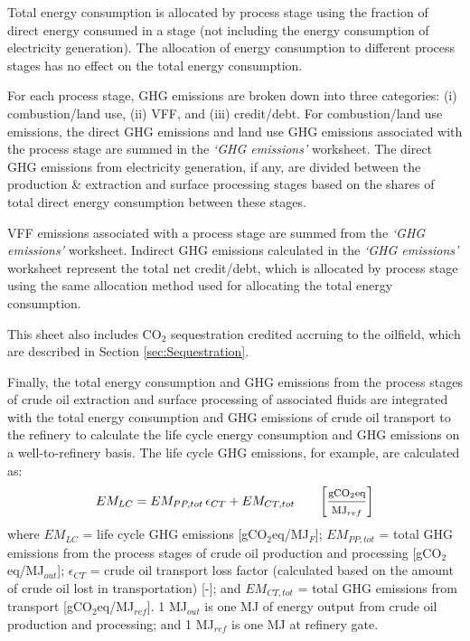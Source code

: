 \documentclass[11pt]{report}
\newcommand{\marg}[1]{{\footnotesize\textit{\textcolor{stanford}{'#1'}}}}
\newcommand{\marginnote}[1]{\marginpar{\marg{#1}}}
\newcommand{\sheet}[1]{\textit{`{#1}'}}
\begin{document}
Total energy consumption is allocated by process stage using the fraction of direct energy consumed in a stage (not including the energy consumption of electricity generation). The allocation of energy consumption to different process stages has no effect on the total energy consumption.

For each process stage, GHG emissions are broken down into three categories: (i) combustion/land use, (ii) VFF, and (iii) credit/debt. For combustion/land use emissions, the direct GHG emissions and land use GHG emissions associated with the process stage are summed \marginnote{GHG \\ Emissions Table 1} in the \sheet{GHG emissions} worksheet. The direct GHG emissions from electricity generation, if any, are divided between the production \& extraction and surface processing stages based on the shares of total direct energy consumption between these stages. 

VFF emissions associated with a process stage are summed from the \sheet{GHG emissions} \marginnote{GHG \\ Emissions Table 1} worksheet. Indirect GHG emissions calculated in the \sheet{GHG emissions} worksheet represent the total net credit/debt, which is \marginnote{GHG \\ Emissions Table 2} allocated by process stage using the same allocation method used for allocating the total energy consumption.

This sheet also includes CO$_2$ sequestration credited accruing to the oilfield, which are described in Section \ref{sec:Sequestration}.

Finally, the total energy consumption and GHG emissions from the process stages of crude oil extraction and surface processing of associated fluids are integrated with the total energy consumption and GHG emissions of crude oil transport to the refinery to calculate the life cycle energy consumption and GHG emissions on a well-to-refinery basis. The life cycle GHG emissions, for example, are calculated as:
\begin{equation}
EM_{LC} = EM_{PP,tot}\,\epsilon_{CT}+EM_{CT,tot} \quad\quad\footnotesize{\left[\frac{\text{gCO$_{2}$eq}}{\text{MJ$_{ref}$}}\right]}
\end{equation}
where $EM_{LC}$ = life cycle GHG emissions [gCO$_{2}$eq/MJ$_{F}$]; $EM_{PP,tot}$ = total GHG emissions from the process stages of crude oil production and processing [gCO$_{2}$eq/MJ$_{out}$]; $\epsilon_{CT}$ = crude oil transport loss factor (calculated based on the amount of crude oil lost in transportation) [-]; and $EM_{CT,tot}$ = total GHG emissions from transport [gCO$_{2}$eq/MJ$_{ref}$]. 1 MJ$_{out}$ is one MJ of energy output from crude oil production and processing; and 1 MJ$_{ref}$ is one MJ at refinery gate. 
\end{document}
